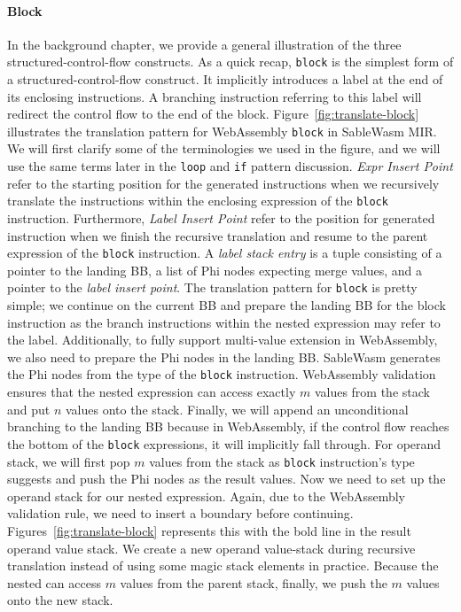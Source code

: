 \paragraph{Block} In the background chapter, we provide a general illustration of the three structured-control-flow constructs.  As a quick recap, \texttt{block} is the simplest form of a structured-control-flow construct. It implicitly introduces a label at the end of its enclosing instructions. A branching instruction referring to this label will redirect the control flow to the end of the block. Figure~\ref{fig:translate-block} illustrates the translation pattern for WebAssembly \texttt{block} in SableWasm MIR.  We will first clarify some of the terminologies we used in the figure, and we will use the same terms later in the \texttt{loop} and \texttt{if} pattern discussion. \emph{Expr Insert Point} refer to the starting position for the generated instructions when we recursively translate the instructions within the enclosing expression of the \texttt{block} instruction. Furthermore, \emph{Label Insert Point} refer to the position for generated instruction when we finish the recursive translation and resume to the parent expression of the \texttt{block} instruction. A \emph{label stack entry} is a tuple consisting of a pointer to the landing BB, a list of Phi nodes expecting merge values, and a pointer to the \emph{label insert point}. The translation pattern for \texttt{block} is pretty simple; we continue on the current BB and prepare the landing BB for the block instruction as the branch instructions within the nested expression may refer to the label. Additionally, to fully support multi-value extension in WebAssembly, we also need to prepare the Phi nodes in the landing BB. SableWasm generates the Phi nodes from the type of the \texttt{block} instruction. WebAssembly validation ensures that the nested expression can access exactly $m$ values from the stack and put $n$ values onto the stack. Finally, we will append an unconditional branching to the landing BB because in WebAssembly, if the control flow reaches the bottom of the \texttt{block} expressions, it will implicitly fall through. For operand stack, we will first pop $m$ values from the stack as \texttt{block} instruction's type suggests and push the Phi nodes as the result values. Now we need to set up the operand stack for our nested expression. Again, due to the WebAssembly validation rule, we need to insert a boundary before continuing. Figures~\ref{fig:translate-block} represents this with the bold line in the result operand value stack. We create a new operand value-stack during recursive translation instead of using some magic stack elements in practice.  Because the nested can access $m$ values from the parent stack, finally, we push the $m$ values onto the new stack.


